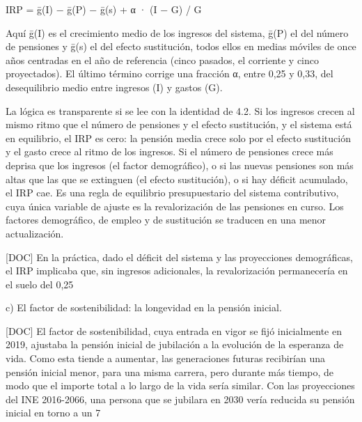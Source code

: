 \documentclass[10pt,a4paper]{article}
\begin{document}
IRP = ḡ(I) − ḡ(P) − ḡ(s) + α · (I − G) / G

Aquí ḡ(I) es el crecimiento medio de los ingresos del sistema, ḡ(P) el del número de pensiones y ḡ(s) el del efecto sustitución, todos ellos en medias móviles de once años centradas en el año de referencia (cinco pasados, el corriente y cinco proyectados). El último término corrige una fracción α, entre 0,25 y 0,33, del desequilibrio medio entre ingresos (I) y gastos (G).

La lógica es transparente si se lee con la identidad de 4.2. Si los ingresos crecen al mismo ritmo que el número de pensiones y el efecto sustitución, y el sistema está en equilibrio, el IRP es cero: la pensión media crece solo por el efecto sustitución y el gasto crece al ritmo de los ingresos. Si el número de pensiones crece más deprisa que los ingresos (el factor demográfico), o si las nuevas pensiones son más altas que las que se extinguen (el efecto sustitución), o si hay déficit acumulado, el IRP cae. Es una regla de equilibrio presupuestario del sistema contributivo, cuya única variable de ajuste es la revalorización de las pensiones en curso. Los factores demográfico, de empleo y de sustitución se traducen en una menor actualización.

[DOC] En la práctica, dado el déficit del sistema y las proyecciones demográficas, el IRP implicaba que, sin ingresos adicionales, la revalorización permanecería en el suelo del 0,25%

c) El factor de sostenibilidad: la longevidad en la pensión inicial.

[DOC] El factor de sostenibilidad, cuya entrada en vigor se fijó inicialmente en 2019, ajustaba la pensión inicial de jubilación a la evolución de la esperanza de vida. Como esta tiende a aumentar, las generaciones futuras recibirían una pensión inicial menor, para una misma carrera, pero durante más tiempo, de modo que el importe total a lo largo de la vida sería similar. Con las proyecciones del INE 2016-2066, una persona que se jubilara en 2030 vería reducida su pensión inicial en torno a un 7%
\end{document}
